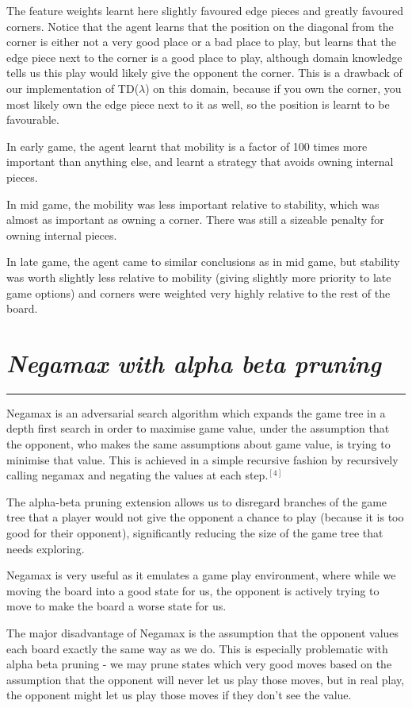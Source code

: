 \documentclass[10pt]{report}
\begin{document}
\begin{multicols}{2}
The feature weights learnt here slightly favoured edge pieces and greatly favoured corners. Notice that the agent learns that the position on the diagonal from the corner is either not a very good place or a bad place to play, but learns that the edge piece next to the corner is a good place to play, although domain knowledge tells us this play would likely give the opponent the corner. This is a drawback of our implementation of TD($\lambda$) on this domain, because if you own the corner, you most likely own the edge piece next to it as well, so the position is learnt to be favourable.

In early game, the agent learnt that mobility is a factor of 100 times more important than anything else, and learnt a strategy that avoids owning internal pieces.

In mid game, the mobility was less important relative to stability, which was almost as important as owning a corner. There was still a sizeable penalty for owning internal pieces.

In late game, the agent came to similar conclusions as in mid game, but stability was worth slightly less relative to mobility (giving slightly more priority to late game options) and corners were weighted very highly relative to the rest of the board.

\section*{\emph{Negamax with alpha beta pruning}}
\hrule

Negamax is an adversarial search algorithm which expands the game tree in a depth first search in order to maximise game value, under the assumption that the opponent, who makes the same assumptions about game value, is trying to minimise that value. This is achieved in a simple recursive fashion by recursively calling negamax and negating the values at each step.$^{[4]}$

The alpha-beta pruning extension allows us to disregard branches of the game tree that a player would not give the opponent a chance to play (because it is too good for their opponent), significantly reducing the size of the game tree that needs exploring.

Negamax is very useful as it emulates a game play environment, where while we moving the board into a good state for us, the opponent is actively trying to move to make the board a worse state for us.

The major disadvantage of Negamax is the assumption that the opponent values each board exactly the same way as we do. This is especially problematic with alpha beta pruning - we may prune states which very good moves based on the assumption that the opponent will never let us play those moves, but in real play, the opponent might let us play those moves if they don't see the value.

\end{multicols}
\end{document}
